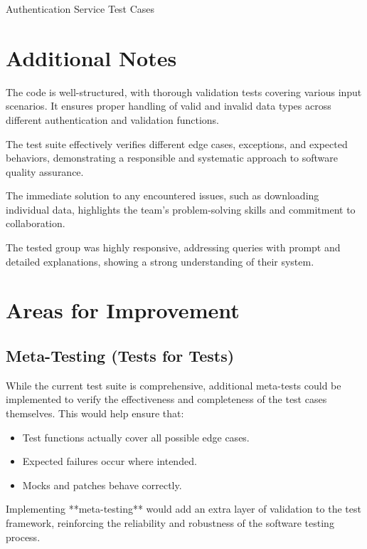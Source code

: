 \caption{Authentication Service Test Cases}
\label{tab:authentication_service_tests}

\section{Additional Notes}

The code is well-structured, with thorough validation tests covering various input scenarios. It ensures proper handling of valid and invalid data types across different authentication and validation functions.

The test suite effectively verifies different edge cases, exceptions, and expected behaviors, demonstrating a responsible and systematic approach to software quality assurance.

The immediate solution to any encountered issues, such as downloading individual data, highlights the team's problem-solving skills and commitment to collaboration.

The tested group was highly responsive, addressing queries with prompt and detailed explanations, showing a strong understanding of their system.

\section{Areas for Improvement}

\subsection{Meta-Testing (Tests for Tests)}
While the current test suite is comprehensive, additional meta-tests could be implemented to verify the effectiveness and completeness of the test cases themselves. This would help ensure that:
\begin{itemize}
    \item Test functions actually cover all possible edge cases.
    \item Expected failures occur where intended.
    \item Mocks and patches behave correctly.
\end{itemize}

Implementing **meta-testing** would add an extra layer of validation to the test framework, reinforcing the reliability and robustness of the software testing process.
